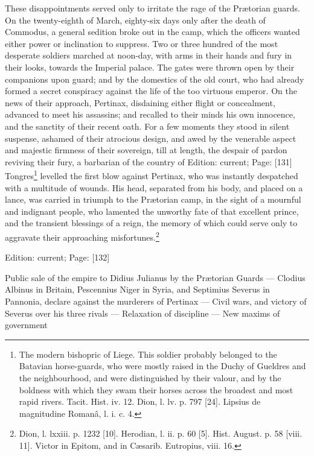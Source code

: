 These disappointments served only to irritate the rage of the Prætorian guards. On the twenty-eighth of March, eighty-six days only after the death of Commodus, a general sedition broke out in the camp, which the officers wanted either power or inclination to suppress. Two or three hundred of the most desperate soldiers marched at noon-day, with arms in their hands and fury in their looks, towards the Imperial palace. The gates were thrown open by their companions upon guard; and by the domestics of the old court, who had already formed a secret conspiracy against the life of the too virtuous emperor. On the news of their approach, Pertinax, disdaining either flight or concealment, advanced to meet his assassins; and recalled to their minds his own innocence, and the sanctity of their recent oath. For a few moments they stood in silent suspense, ashamed of their atrocious design, and awed by the venerable aspect and majestic firmness of their sovereign, till at length, the despair of pardon reviving their fury, a barbarian of the country of Edition: current; Page: [131] Tongres\footnote{The modern bishopric of Liege. This soldier probably belonged to the Batavian horse-guards, who were mostly raised in the Duchy of Gueldres and the neighbourhood, and were distinguished by their valour, and by the boldness with which they swam their horses across the broadest and most rapid rivers. Tacit. Hist. iv. 12. Dion, l. lv. p. 797 [24]. Lipsius de magnitudine Romanâ, l. i. c. 4.} levelled the first blow against Pertinax, who was instantly despatched with a multitude of wounds. His head, separated from his body, and placed on a lance, was carried in triumph to the Prætorian camp, in the sight of a mournful and indignant people, who lamented the unworthy fate of that excellent prince, and the transient blessings of a reign, the memory of which could serve only to aggravate their approaching misfortunes.\footnote{Dion, l. lxxiii. p. 1232 [10]. Herodian, l. ii. p. 60 [5]. Hist. August. p. 58 [viii. 11]. Victor in Epitom, and in Cæsarib. Eutropius, viii. 16.}

Edition: current; Page: [132]


Public sale of the empire to Didius Julianus by the Prætorian Guards \texthebrew{—} Clodius Albinus in Britain, Pescennius Niger in Syria, and Septimius Severus in Pannonia, declare against the murderers of Pertinax \texthebrew{—} Civil wars, and victory of Severus over his three rivals \texthebrew{—} Relaxation of discipline \texthebrew{—} New maxims of government

